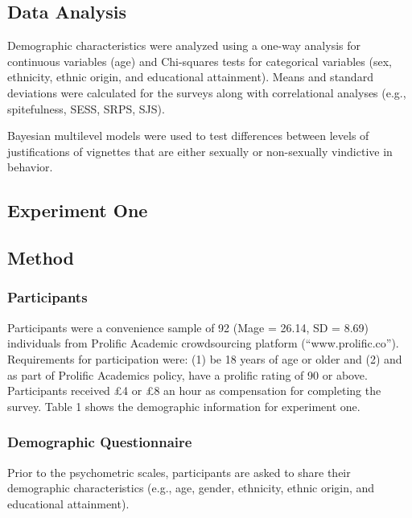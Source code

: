 \documentclass[
  donotrepeattitle,doc, 12pt, a4paper,floatsintext]{apa7}
\begin{document}
\hypertarget{data-analysis}{%
\subsection{Data Analysis}\label{data-analysis}}

Demographic characteristics were analyzed using a one-way analysis for continuous variables (age) and Chi-squares tests for categorical variables (sex, ethnicity, ethnic origin, and educational attainment). Means and standard deviations were calculated for the surveys along with correlational analyses (e.g., spitefulness, SESS, SRPS, SJS).

Bayesian multilevel models were used to test differences between levels of justifications of vignettes that are either sexually or non-sexually vindictive in behavior.

\hypertarget{experiment-one}{%
\subsection{Experiment One}\label{experiment-one}}

\hypertarget{method-1}{%
\subsection{Method}\label{method-1}}

\hypertarget{participants-1}{%
\subsubsection{Participants}\label{participants-1}}

Participants were a convenience sample of 92 (Mage = 26.14, SD = 8.69) individuals from Prolific Academic crowdsourcing platform (``www.prolific.co''). Requirements for participation were: (1) be 18 years of age or older and (2) and as part of Prolific Academics policy, have a prolific rating of 90 or above. Participants received £4 or £8 an hour as compensation for completing the survey. Table 1 shows the demographic information for experiment one.

\hypertarget{demographic-questionnaire-1}{%
\subsubsection{Demographic Questionnaire}\label{demographic-questionnaire-1}}

Prior to the psychometric scales, participants are asked to share their demographic characteristics (e.g., age, gender, ethnicity, ethnic origin, and educational attainment).
\end{document}
